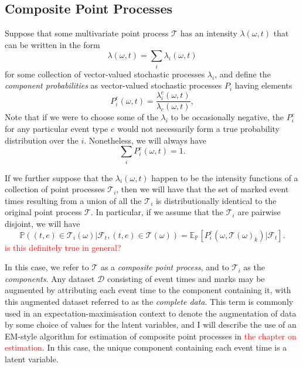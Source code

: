 \documentclass[honours,12pt]{unswthesis}
\numberwithin{equation}{section}
\begin{document}

\subsection{Composite Point Processes}
Suppose that some multivariate point process $\mathcal{T}$ has an intensity $\lambda(\omega,t)$ that can be written in the form
$$\lambda(\omega,t) = \sum_i \lambda_i(\omega,t)$$
for some collection of vector-valued stochastic processes $\lambda_i$, and define the \textit{component probabilities} as vector-valued stochastic processes $P_i$ having elements
$$P_i^e(\omega,t) = \frac{\lambda^e_i(\omega,t)}{\lambda_e(\omega,t)},$$
Note that if we were to choose some of the $\lambda_i$ to be occasionally negative, the $P_i^e$ for any particular event type $e$ would not necessarily form a true probability distribution over the $i$. Nonetheless, we will always have
$$\sum_i P_i^e(\omega,t) = 1.$$

If we further suppose that the $\lambda_i(\omega,t)$ happen to be the intensity functions of a collection of point processes $\mathcal{T}_i$, then we will have that the set of marked event times resulting from a union of all the $\mathcal{T}_i$ is distributionally identical to the original point process $\mathcal{T}$. In particular, if we assume that the $\mathcal{T}_i$ are pairwise disjoint, we will have
$$\mathbb{P}((t,e) \in \mathcal{T}_i(\omega)\vert\mathcal{F}_t, (t,e)\in \mathcal{T}(\omega)) = \mathbb{E}_\mathbb{P}\left[P_i^e(\omega,\mathcal{T}(\omega)_k)\vert\mathcal{F}_t\right].$$
\textcolor{red}{is this definitely true in general?}

In this case, we refer to $\mathcal{T}$ as a \textit{composite point process}, and to $\mathcal{T}_i$ as the \textit{components}. Any dataset $\mathcal{D}$ consisting of event times and marks may be augmented by attributing each event time to the component containing it, with this augmented dataset referred to as the \textit{complete data}. This term is commonly used in an expectation-maximisation context to denote the augmentation of data by some choice of values for the latent variables, and I will describe the use of an EM-style algorithm for estimation of composite point processes in \textcolor{red}{the chapter on estimation}. In this case, the unique component containing each event time is a latent variable.
\end{document}
